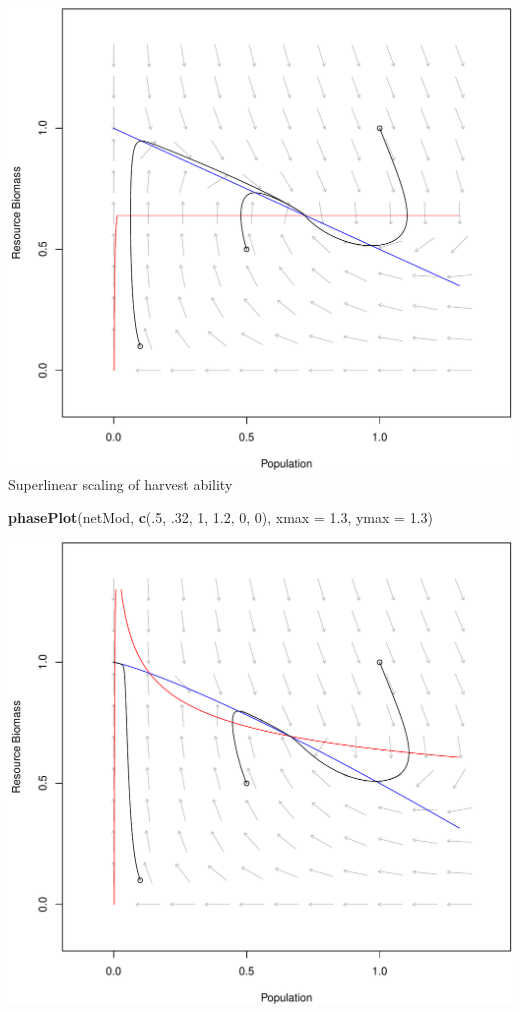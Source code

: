 \documentclass[]{article}
\newenvironment{Shaded}{\begin{snugshade}}{\end{snugshade}}
\newcommand{\KeywordTok}[1]{\textcolor[rgb]{0.13,0.29,0.53}{\textbf{{#1}}}}
\newcommand{\DataTypeTok}[1]{\textcolor[rgb]{0.13,0.29,0.53}{{#1}}}
\newcommand{\DecValTok}[1]{\textcolor[rgb]{0.00,0.00,0.81}{{#1}}}
\newcommand{\FloatTok}[1]{\textcolor[rgb]{0.00,0.00,0.81}{{#1}}}
\newcommand{\NormalTok}[1]{{#1}}
\begin{document}
\includegraphics{consumerresource_files/figure-latex/unnamed-chunk-4-1.pdf}
Superlinear scaling of harvest ability

\begin{Shaded}
\begin{Highlighting}[]
\KeywordTok{phasePlot}\NormalTok{(netMod, }\KeywordTok{c}\NormalTok{(.}\DecValTok{5}\NormalTok{, .}\DecValTok{32}\NormalTok{, }\DecValTok{1}\NormalTok{, }\FloatTok{1.2}\NormalTok{, }\DecValTok{0}\NormalTok{, }\DecValTok{0}\NormalTok{), }\DataTypeTok{xmax =} \FloatTok{1.3}\NormalTok{, }\DataTypeTok{ymax =} \FloatTok{1.3}\NormalTok{)}
\end{Highlighting}
\end{Shaded}

\includegraphics{consumerresource_files/figure-latex/unnamed-chunk-5-1.pdf}
\end{document}
